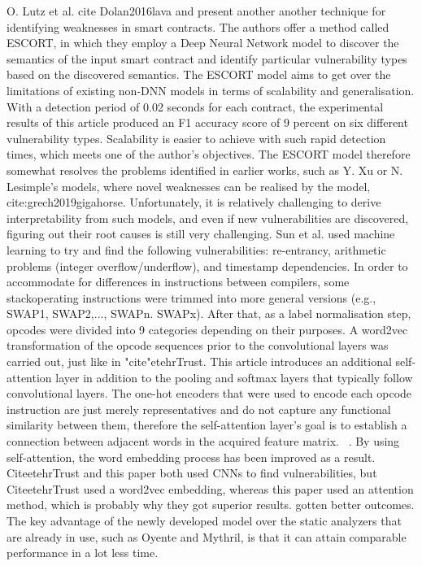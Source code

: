 O. Lutz et al. cite Dolan2016lava and present another another technique for identifying weaknesses in smart contracts.
The authors offer a method called ESCORT, in which they employ a Deep Neural Network model to discover the semantics of the input smart contract and identify particular vulnerability types based on the discovered semantics.
The ESCORT model aims to get over the limitations of existing non-DNN models in terms of scalability and generalisation.
With a detection period of 0.02 seconds for each contract, the experimental results of this article produced an F1 accuracy score of 9 percent on six different vulnerability types.
Scalability is easier to achieve with such rapid detection times, which meets one of the author's objectives.
The ESCORT model therefore somewhat resolves the problems identified in earlier works, such as Y. Xu or N. Lesimple's models, where novel weaknesses can be realised by the model, cite:grech2019gigahorse.
Unfortunately, it is relatively challenging to derive interpretability from such models, and even if new vulnerabilities are discovered, figuring out their root causes is still very challenging.
Sun et al. used machine learning to try and find the following vulnerabilities: re-entrancy, arithmetic problems (integer overflow/underflow), and timestamp dependencies.
In order to accommodate for differences in instructions between compilers, some stackoperating instructions were trimmed into more general versions (e.g., SWAP1, SWAP2,..., SWAPn. SWAPx).
After that, as a label normalisation step, opcodes were divided into 9 categories depending on their purposes.
A word2vec transformation of the opcode sequences prior to the convolutional layers was carried out, just like in "cite"etehrTrust.
This article introduces an additional self-attention layer in addition to the pooling and softmax layers that typically follow convolutional layers.
The one-hot encoders that were used to encode each opcode instruction are just merely representatives and do not capture any functional similarity between them, therefore the self-attention layer's goal is to establish a connection between adjacent words in the acquired feature matrix. ~\cite{grech2019gigahorse}.
By using self-attention, the word embedding process has been improved as a result.
CiteetehrTrust and this paper both used CNNs to find vulnerabilities, but CiteetehrTrust used a word2vec embedding, whereas this paper used an attention method, which is probably why they got superior results.
gotten better outcomes. The key advantage of the newly developed model over the static analyzers that are already in use, such as Oyente and Mythril, is that it can attain comparable performance in a lot less time.

